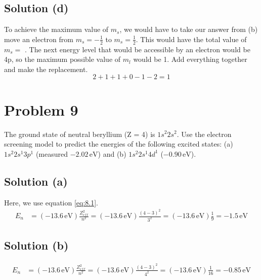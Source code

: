 \documentclass[12pt]{report}
\begin{document}
    \subsection{Solution (d)}
        To achieve the maximum value of $m_s$, we would have to take our answer from (b) move an electron from $m_s = -\frac{1}{2}$ to $m_s = \frac{1}{2}$.
        This would have the total value of $m_s = $ .
        The next energy level that would be accessible by an electron would be 4p, so the maximum possible value of $m_l$ would be 1.
        Add everything together and make the replacement.
        \begin{equation}
            2 + 1 + 1 + 0 - 1 - 2 = \boxed{1}
        \end{equation}
    \pagebreak

\section{Problem 9} %
    The ground state of neutral beryllium (Z = 4) is $1s^2 2s^2$. 
    Use the electron screening model to predict the energies of the following excited states: (a) $1s^2 2s^1 3p^1$ (measured $-2.02\,\unit{\eV}$) and (b) $1s^2 2s^1 4d^1$ ($-0.90\,\unit{\eV}$).

    \subsection{Solution (a)}
        Here, we use equation \ref{eq:8.1}.
        \begin{align}
            E_n &=  (-13.6\,\unit{\eV})\frac{Z_{eff}^2}{n^2}
                =   (-13.6\,\unit{\eV})\frac{(4 - 3)^2}{3^2}
                =   (-13.6\,\unit{\eV})\frac{1}{9}
                =   \boxed{-1.5\,\unit{\eV}}
        \end{align}

    \subsection{Solution (b)}
        \begin{align}
            E_n &=  (-13.6\,\unit{\eV})\frac{Z_{eff}^2}{n^2}
                =   (-13.6\,\unit{\eV})\frac{(4 - 3)^2}{4^2}
                =   (-13.6\,\unit{\eV})\frac{1}{16}
                =   \boxed{-0.85\,\unit{\eV}}
        \end{align}
    \pagebreak
\end{document}
